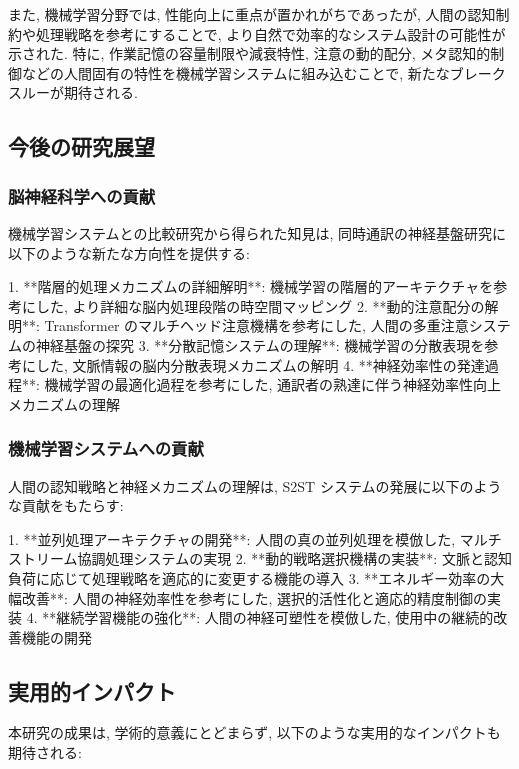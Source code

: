また, 機械学習分野では, 性能向上に重点が置かれがちであったが, 人間の認知制約や処理戦略を参考にすることで, より自然で効率的なシステム設計の可能性が示された.
特に, 作業記憶の容量制限や減衰特性, 注意の動的配分, メタ認知的制御などの人間固有の特性を機械学習システムに組み込むことで, 新たなブレークスルーが期待される.

\subsection{今後の研究展望}

\subsubsection{脳神経科学への貢献}

機械学習システムとの比較研究から得られた知見は, 同時通訳の神経基盤研究に以下のような新たな方向性を提供する:

1. **階層的処理メカニズムの詳細解明**: 機械学習の階層的アーキテクチャを参考にした, より詳細な脳内処理段階の時空間マッピング
2. **動的注意配分の解明**: Transformer のマルチヘッド注意機構を参考にした, 人間の多重注意システムの神経基盤の探究
3. **分散記憶システムの理解**: 機械学習の分散表現を参考にした, 文脈情報の脳内分散表現メカニズムの解明
4. **神経効率性の発達過程**: 機械学習の最適化過程を参考にした, 通訳者の熟達に伴う神経効率性向上メカニズムの理解

\subsubsection{機械学習システムへの貢献}

人間の認知戦略と神経メカニズムの理解は, S2ST システムの発展に以下のような貢献をもたらす:

1. **並列処理アーキテクチャの開発**: 人間の真の並列処理を模倣した, マルチストリーム協調処理システムの実現
2. **動的戦略選択機構の実装**: 文脈と認知負荷に応じて処理戦略を適応的に変更する機能の導入
3. **エネルギー効率の大幅改善**: 人間の神経効率性を参考にした, 選択的活性化と適応的精度制御の実装
4. **継続学習機能の強化**: 人間の神経可塑性を模倣した, 使用中の継続的改善機能の開発

\subsection{実用的インパクト}

本研究の成果は, 学術的意義にとどまらず, 以下のような実用的なインパクトも期待される:

